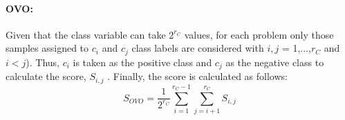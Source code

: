 \paragraph{OVO:}
Given that the class variable can take $2^{r_C}$ values, for each problem only those samples assigned to $c_i$ and $c_j$ class labels are considered with $i, j$ = 1,...,$r_C$ and $i < j$). Thus, $c_i$ is taken as the positive class and $c_j$ as the negative class to calculate the score, $S_{i,j}$ . Finally, the score is calculated as follows:
\begin{equation}
    S_{OVO} = \frac{1}{2^{r_C}}\sum_{i=1}^{r_C-1}\sum_{j=i+1}^{r_C} S_{i,j}
\end{equation}









